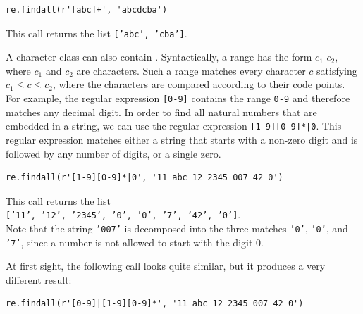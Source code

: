 \begin{verbatim}
re.findall(r'[abc]+', 'abcdcba')
\end{verbatim}

\noindent
This call returns the list \texttt{['abc', 'cba']}.

A character class can also contain .  Syntactically, a range has the form
$c_1\texttt{-}c_2$, where $c_1$ and $c_2$ are  characters.  Such a range matches every
character $c$ satisfying $c_1 \leq c \leq c_2$, where the characters are compared according to their
 code points.  For example, the regular expression \texttt{[0-9]} contains the range
\texttt{0-9} and therefore matches any decimal digit.  In order to find all natural numbers that are embedded in
a string, we can use the regular expression \texttt{[1-9][0-9]*|0}.  This regular expression matches either a
string that starts with a non-zero digit and is followed by any number of digits, or a single zero.

\begin{verbatim}
re.findall(r'[1-9][0-9]*|0', '11 abc 12 2345 007 42 0')
\end{verbatim}

\noindent
This call returns the list
\\[0.2cm]
\hspace*{1.3cm}
\texttt{['11', '12', '2345', '0', '0', '7', '42', '0']}.
\\[0.2cm]
Note that the string \texttt{'007'} is decomposed into the three matches \texttt{'0'}, \texttt{'0'}, and
\texttt{'7'}, since a number is not allowed to start with the digit $0$.

At first sight, the following call looks quite similar, but it produces a very different result:

\begin{verbatim}
re.findall(r'[0-9]|[1-9][0-9]*', '11 abc 12 2345 007 42 0')
\end{verbatim}

